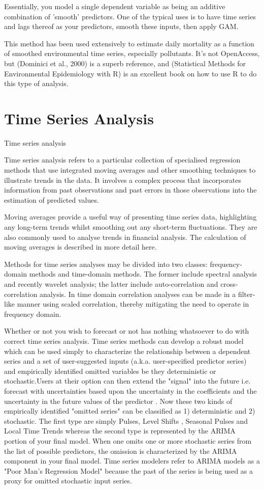\documentclass{article}\usepackage[]{graphicx}\usepackage[]{color}
\begin{document}
Essentially, you model a single dependent variable as being an additive combination of 'smooth' predictors. One of the typical uses is to have time series and lags thereof as your predictors, smooth these inputs, then apply GAM.

This method has been used extensively to estimate daily mortality as a function of smoothed environmental time series, especially pollutants. It's not OpenAccess, but (Dominici et al., 2000) is a superb reference, and (Statistical Methods for Environmental Epidemiology with R) is an excellent book on how to use R to do this type of analysis.

\section{Time Series Analysis}

Time series analysis

Time series analysis refers to a particular collection of specialised regression methods that use integrated moving averages and other smoothing techniques to illustrate trends in the data. It involves a complex process that incorporates information from past observations and past errors in those observations into the estimation of predicted values.

Moving averages provide a useful way of presenting time series data, highlighting any long-term trends whilst smoothing out any short-term fluctuations. They are also commonly used to analyse trends in financial analysis. The calculation of moving averages is described in more detail here.

Methods for time series analyses may be divided into two classes: frequency-domain methods and time-domain methods. The former include spectral analysis and recently wavelet analysis; the latter include auto-correlation and cross-correlation analysis. In time domain correlation analyses can be made in a filter-like manner using scaled correlation, thereby mitigating the need to operate in frequency domain.

Whether or not you wish to forecast or not has nothing whatsoever to do with correct time series analysis. Time series methods can develop a robust model which can be used simply to characterize the relationship between a dependent series and a set of user-suggested inputs (a.k.a. user-specified predictor series) and empirically identified omitted variables be they deterministic or stochastic.Users at their option can then extend the "signal" into the future i.e. forecast with uncertainties based upon the uncertainty in the coefficients and the uncertainty in the future values of the predictor . Now these two kinds of empirically identified "omitted series" can be classified as 1) deterministic and 2) stochastic. The first type are simply Pulses, Level Shifts , Seasonal Pulses and Local Time Trends whereas the second type is represented by the ARIMA portion of your final model. When one omits one or more stochastic series from the list of possible predictors, the omission is characterized by the ARIMA component in your final model. Time series modelers refer to ARIMA models as a "Poor Man's Regression Model" because the past of the series is being used as a proxy for omitted stochastic input series.
\end{document}
